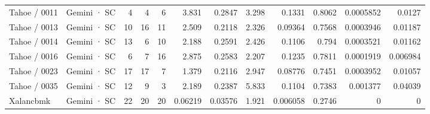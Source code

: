 \begin{tabular}{llrrrrrrrrrr}
Tahoe / 0011 & Gemini · SC & 4 & 4 & 6 & 3.831 & 0.2847 & 3.298 & 0.1331 & 0.8062 & 0.0005852 & 0.0127 \\
Tahoe / 0013 & Gemini · SC & 10 & 16 & 11 & 2.509 & 0.2118 & 2.326 & 0.09364 & 0.7568 & 0.0003946 & 0.01187 \\
Tahoe / 0014 & Gemini · SC & 13 & 6 & 10 & 2.188 & 0.2591 & 2.426 & 0.1106 & 0.794 & 0.0003521 & 0.01162 \\
Tahoe / 0016 & Gemini · SC & 6 & 7 & 16 & 2.875 & 0.2583 & 2.207 & 0.1235 & 0.7811 & 0.0001919 & 0.006984 \\
Tahoe / 0023 & Gemini · SC & 17 & 17 & 7 & 1.379 & 0.2116 & 2.947 & 0.08776 & 0.7451 & 0.0003952 & 0.01057 \\
Tahoe / 0035 & Gemini · SC & 12 & 9 & 3 & 2.189 & 0.2387 & 5.833 & 0.1104 & 0.7383 & 0.001377 & 0.04039 \\
Xalancbmk & Gemini · SC & 22 & 20 & 20 & 0.06219 & 0.03576 & 1.921 & 0.006058 & 0.2746 & 0 & 0 \\
\bottomrule
\end{tabular}
